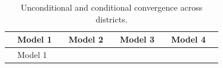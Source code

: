 \documentclass[
  a4paper, 
  twoside,
  review
]{article}
\begin{document}
\begin{longtable}[]{@{}
  >{\raggedright\arraybackslash}p{}
  >{\raggedright\arraybackslash}p{}
  >{\raggedright\arraybackslash}p{}
  >{\raggedright\arraybackslash}p{}
  >{\raggedright\arraybackslash}p{}
  >{\raggedright\arraybackslash}p{}
  >{\raggedright\arraybackslash}p{}
  >{\raggedright\arraybackslash}p{}
  >{\raggedright\arraybackslash}p{}@{}}
\caption{Unconditional and conditional convergence across
districts.}\label{tbl-models}\tabularnewline
\toprule\noalign{}
\begin{minipage}[b]{\linewidth}\raggedright
\end{minipage} & \begin{minipage}[b]{\linewidth}\raggedright
Model 1
\end{minipage} & \begin{minipage}[b]{\linewidth}\raggedright
\end{minipage} & \begin{minipage}[b]{\linewidth}\raggedright
Model 2
\end{minipage} & \begin{minipage}[b]{\linewidth}\raggedright
\end{minipage} & \begin{minipage}[b]{\linewidth}\raggedright
Model 3
\end{minipage} & \begin{minipage}[b]{\linewidth}\raggedright
\end{minipage} & \begin{minipage}[b]{\linewidth}\raggedright
Model 4
\end{minipage} & \begin{minipage}[b]{\linewidth}\raggedright
\end{minipage} \\
\midrule\noalign{}
\endfirsthead
\toprule\noalign{}
\begin{minipage}[b]{\linewidth}\raggedright
\end{minipage} & \begin{minipage}[b]{\linewidth}\raggedright
Model 1
\end{minipage} & \begin{minipage}[b]{\linewidth}\raggedright

\end{minipage}
\end{longtable}
\end{document}
